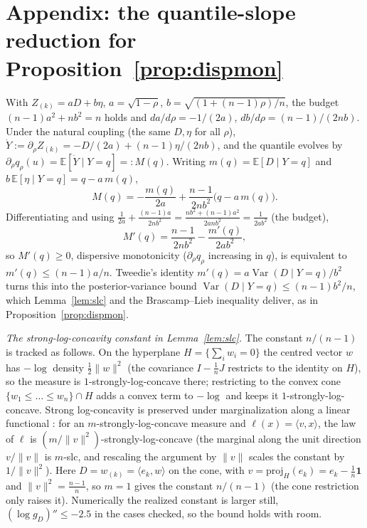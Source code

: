 \documentclass[11pt]{article}
\begin{document}
\section*{Appendix: the quantile-slope reduction for Proposition~\ref{prop:dispmon}}

With $Z_{(k)}=aD+b\eta$, $a=\sqrt{1-\rho}$, $b=\sqrt{(1+(n-1)\rho)/n}$, the budget
$(n-1)a^2+nb^2=n$ holds and $da/d\rho=-1/(2a)$, $db/d\rho=(n-1)/(2nb)$. Under the natural coupling
(the same $D,\eta$ for all $\rho$), $\dot Y:=\partial_\rho Z_{(k)}=-D/(2a)+(n-1)\eta/(2nb)$, and the
quantile evolves by $\partial_\rho q_\rho(u)=\mathbb E[\dot Y\mid Y=q]=:M(q)$. Writing
$m(q)=\mathbb E[D\mid Y=q]$ and $b\,\mathbb E[\eta\mid Y=q]=q-a\,m(q)$,
\begin{equation}
M(q)=-\frac{m(q)}{2a}+\frac{n-1}{2nb^2}\big(q-a\,m(q)\big).
\end{equation}
Differentiating and using $\tfrac1{2a}+\tfrac{(n-1)a}{2nb^2}=\tfrac{nb^2+(n-1)a^2}{2anb^2}=\tfrac1{2ab^2}$
(the budget),
\begin{equation}
M'(q)=\frac{n-1}{2nb^2}-\frac{m'(q)}{2ab^2},
\end{equation}
so $M'(q)\ge0$, dispersive monotonicity ($\partial_\rho q_\rho$ increasing in $q$), is equivalent to
$m'(q)\le (n-1)a/n$. Tweedie's identity $m'(q)=a\operatorname{Var}(D\mid Y=q)/b^2$ turns this into the
posterior-variance bound $\operatorname{Var}(D\mid Y=q)\le (n-1)b^2/n$, which Lemma~\ref{lem:slc} and
the Brascamp--Lieb inequality deliver, as in Proposition~\ref{prop:dispmon}.

\medskip
\noindent\emph{The strong-log-concavity constant in Lemma~\ref{lem:slc}.} The constant $n/(n-1)$ is
tracked as follows. On the hyperplane $H=\{\sum_i w_i=0\}$ the centred vector $w$ has $-\log$ density
$\tfrac12\|w\|^2$ (the covariance $I-\tfrac1nJ$ restricts to the identity on $H$), so the measure is
$1$-strongly-log-concave there; restricting to the convex cone $\{w_1\le\dots\le w_n\}\cap H$ adds a
convex term to $-\log$ and keeps it $1$-strongly-log-concave. Strong log-concavity is preserved under
marginalization along a linear functional \citep{prekopa1973,brascamplieb1976,saumard2014}: for an
$m$-strongly-log-concave measure and $\ell(x)=\langle v,x\rangle$, the law of $\ell$ is
$(m/\|v\|^2)$-strongly-log-concave (the marginal along the unit direction $v/\|v\|$ is $m$-slc, and
rescaling the argument by $\|v\|$ scales the constant by $1/\|v\|^2$). Here $D=w_{(k)}=\langle e_k,w\rangle$
on the cone, with $v=\mathrm{proj}_H(e_k)=e_k-\tfrac1n\mathbf 1$ and $\|v\|^2=\tfrac{n-1}n$, so
$m=1$ gives the constant $n/(n-1)$ (the cone restriction only raises it). Numerically the realized
constant is larger still, $(\log g_D)''\le-2.5$ in the cases checked, so the bound holds with room.



\end{document}

